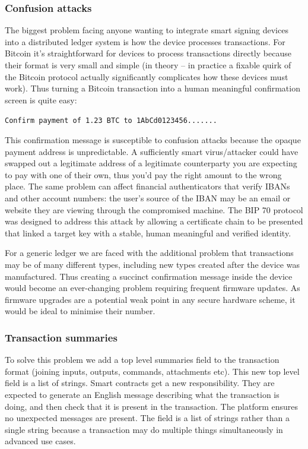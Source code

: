 \documentclass{article}
\begin{document}
\subsubsection{Confusion attacks}

The biggest problem facing anyone wanting to integrate smart signing devices into a distributed ledger system is
how the device processes transactions. For Bitcoin it's straightforward for devices to process transactions
directly because their format is very small and simple (in theory -- in practice a fixable quirk of the Bitcoin
protocol actually significantly complicates how these devices must work). Thus turning a Bitcoin transaction into a
human meaningful confirmation screen is quite easy:

\indent\texttt{Confirm payment of 1.23 BTC to 1AbCd0123456.......}

This confirmation message is susceptible to confusion attacks because the opaque payment address is unpredictable.
A sufficiently smart virus/attacker could have swapped out a legitimate address of a legitimate counterparty you
are expecting to pay with one of their own, thus you'd pay the right amount to the wrong place. The same problem
can affect financial authenticators that verify IBANs and other account numbers: the user's source of the IBAN may
be an email or website they are viewing through the compromised machine. The BIP 70\cite{BIP70} protocol was
designed to address this attack by allowing a certificate chain to be presented that linked a target key with a
stable, human meaningful and verified identity.

For a generic ledger we are faced with the additional problem that transactions may be of many different types,
including new types created after the device was manufactured. Thus creating a succinct confirmation message inside
the device would become an ever-changing problem requiring frequent firmware updates. As firmware upgrades are a
potential weak point in any secure hardware scheme, it would be ideal to minimise their number.

\subsubsection{Transaction summaries}

To solve this problem we add a top level summaries field to the transaction format (joining inputs, outputs,
commands, attachments etc). This new top level field is a list of strings. Smart contracts get a new
responsibility. They are expected to generate an English message describing what the transaction is doing, and then
check that it is present in the transaction. The platform ensures no unexpected messages are present. The field is
a list of strings rather than a single string because a transaction may do multiple things simultaneously in
advanced use cases.
\end{document}
